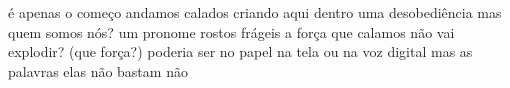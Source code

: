 \begin{poem}
é apenas o começo\verseline
andamos calados\verseline
criando aqui dentro\verseline
uma desobediência\verseline
\qquad mas quem somos nós?\verseline
\qquad \qquad um pronome\verseline
\qquad \qquad rostos frágeis\verseline
a força que calamos\verseline
não vai explodir?\verseline
\hspace{5em}(que força?)\verseline
\qquad poderia ser\verseline
\qquad no papel\verseline
\qquad na tela\verseline
\qquad ou na voz\verseline
\hspace{5em} digital\verseline
mas as palavras\verseline
elas não bastam\verseline
\qquad não
\end{poem}